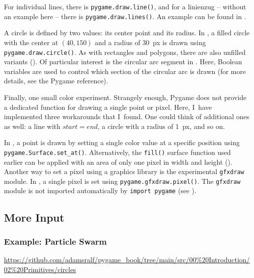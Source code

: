 For individual lines,
there is \texttt{pygame.draw.line()}, and for a \gls{linienzug} -- without an example here -- there is \texttt{pygame.draw.lines()}. An example can be found in .

A circle is defined by two values: its center point and its radius. In , a filled circle with the center at $(40, 150)$ and a radius of \SI{30}{px} is drawn using \texttt{pygame.draw.circle()}. As with rectangles and polygons, there are also unfilled variants (). Of particular interest is the circular arc segment in
. Here, Boolean variables are used to control which section of the circular arc is drawn (for more details, see the Pygame reference).

Finally, one small color experiment. Strangely enough, Pygame does not provide a dedicated function for drawing a single point or pixel. Here, I~have implemented three workarounds that I~found. One could think of additional ones as well: a line with $start = end$, a circle with a radius of \SI{1}{px}, and so on.

In , a point is drawn by setting a single color value at a specific position using \texttt{pygame.Surface.set\_at()}. Alternatively, the \texttt{fill()} surface function used earlier can be applied with an area of only one pixel in width and height (). Another way to set a pixel using a graphics library is the experimental \texttt{gfxdraw} module. In , a single pixel is set using \texttt{pygame.gfxdraw.pixel()}. The \texttt{gfxdraw} module is not imported automatically by
\texttt{import pygame} (see ).


\subsection{More Input}
\subsubsection{Example: Particle Swarm}
\begin{diskbox}
	\url{https://github.com/adamsralf/pygame_book/tree/main/src/00%20Introduction/02%20Primitives/circles}
\end{diskbox}

